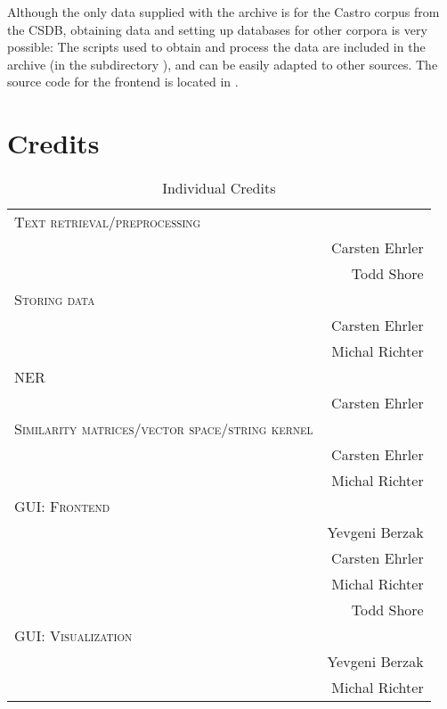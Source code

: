 Although the only data supplied with the archive is for the Castro corpus from the CSDB, obtaining data and setting up databases for other corpora is very possible: The scripts used to obtain and process the data are included in the archive (in the subdirectory ), and can be easily adapted to other sources. The source code for the frontend is located in .

\section{Credits}
\begin{table}[ht]
\centering
\caption{Individual Credits}
\begin{tabular}{l r}
\toprule
  	\textsc{Text retrieval/preprocessing} &  \\
  		& Carsten Ehrler \\
 		& Todd Shore \\
  	\textsc{Storing data} & \\
  		& Carsten Ehrler \\ 
  		& Michal Richter \\
	\textsc{NER} & \\
		& Carsten Ehrler \\
	\textsc{Similarity matrices/vector space/string kernel} & \\
		& Carsten Ehrler \\
		& Michal Richter \\
	\textsc{GUI: Frontend} & \\
		& Yevgeni Berzak \\
  		& Carsten Ehrler \\
		& Michal Richter \\
		& Todd Shore \\
	\textsc{GUI: Visualization} & \\
		& Yevgeni Berzak \\
		& Michal Richter \\
  \bottomrule
\end{tabular}
\end{table}
